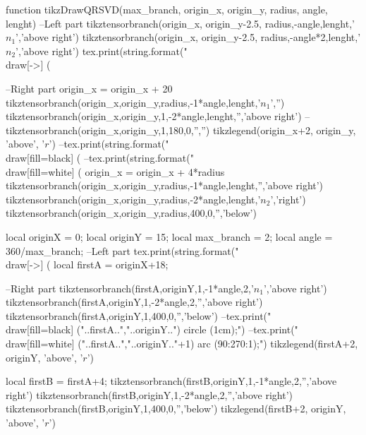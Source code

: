 \begin{luacode*}

function tikzDrawQRSVD(max_branch, origin_x, origin_y, radius, angle, lenght)
	 --Left part
	 tikztensorbranch(origin_x, origin_y-2.5, radius,-angle,lenght,'$n_{1}$','above right')
	 tikztensorbranch(origin_x, origin_y-2.5, radius,-angle*2,lenght,'$n_{2}$','above right')
	 tex.print(string.format("\\draw[->] (%
	 
	 --Right part
	 origin_x = origin_x + 20
	 tikztensorbranch(origin_x,origin_y,radius,-1*angle,lenght,'$n_{1}$','')
	 tikztensorbranch(origin_x,origin_y,1,-2*angle,lenght,'','above right')
	 --tikztensorbranch(origin_x,origin_y,1,180,0,'','')
	 tikzlegend(origin_x+2, origin_y, 'above', '$r$')
	 --tex.print(string.format("\\draw[fill=black] (%
	 --tex.print(string.format("\\draw[fill=white] (%
	 origin_x = origin_x + 4*radius
	 tikztensorbranch(origin_x,origin_y,radius,-1*angle,lenght,'','above right')
	 tikztensorbranch(origin_x,origin_y,radius,-2*angle,lenght,'$n_{2}$','right')
	 tikztensorbranch(origin_x,origin_y,radius,400,0,'','below')

	 local originX = 0;
	 local originY = 15;
	 local max_branch = 2;
	 local angle = 360/max_branch;    
	 --Left part
	 tex.print(string.format("\\draw[->] (%
	 local firstA = originX+18;
	 
	 --Right part
	 tikztensorbranch(firstA,originY,1,-1*angle,2,'$n_{1}$','above right')
	 tikztensorbranch(firstA,originY,1,-2*angle,2,'','above right')
	 tikztensorbranch(firstA,originY,1,400,0,'','below')
	 --tex.print("\\draw[fill=black] ("..firstA..","..originY..") circle (1cm);")
	 --tex.print("\\draw[fill=white] ("..firstA..","..originY.."+1) arc (90:270:1);")
	 tikzlegend(firstA+2, originY, 'above', '$r$')

	 local firstB = firstA+4;
	 tikztensorbranch(firstB,originY,1,-1*angle,2,'','above right')
	 tikztensorbranch(firstB,originY,1,-2*angle,2,'','above right')
	 tikztensorbranch(firstB,originY,1,400,0,'','below')
	 tikzlegend(firstB+2, originY, 'above', '$r$')


\end{luacode*}
